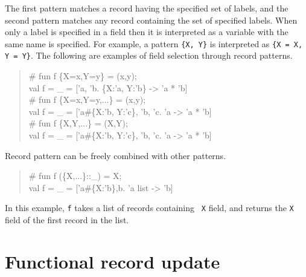 \documentclass{jbook}
\newcommand{\txt}[2]{#2}
\begin{document}
	The first pattern matches a record having the specified set of
labels, and the second pattern matches any record containing the set of
specified labels.
	When only a label is specified in a field then it
is interpreted as a variable with the same name is specified.
	For example, a pattern {\tt \{X, Y\}} is interpreted as 
{\tt \{X = X, Y = Y\}}.
	The following are examples of field selection through record patterns.
\begin{tt}\begin{quote}
\# fun f \{X=x,Y=y\} = (x,y);\\
val f = \_ = ['a, 'b. \{X:'a, Y:'b\} -> 'a * 'b]\\
\# fun f \{X=x,Y=y,...\} = (x,y);\\
val f = \_ = ['a\#\{X:'b, Y:'c\}, 'b, 'c. 'a -> 'a * 'b]\\
\# fun f \{X,Y,...\} = (X,Y);\\
val f = \_ = ['a\#\{X:'b, Y:'c\}, 'b, 'c. 'a -> 'a * 'b]
\end{quote}\end{tt}
	Record pattern can be freely combined with other patterns.
\begin{tt}\begin{quote}
\# fun f (\{X,...\}::\_) = X;\\
val f = \_ = ['a\#\{X:'b\},b. 'a list -> 'b]\\
\end{quote}\end{tt}
	In this example, {\tt f} takes a list of records containing {\tt
X} field, and returns the {\tt X} field of the first record in the list.
\fi%

\section{\txt{フィールドの変更}{Functional record update}}
\label{sec:extensionFieldupdate}
\end{document}
